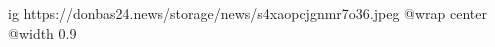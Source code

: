  
 
 
 
 

\ifcmt
  ig https://donbas24.news/storage/news/s4xaopcjgnmr7o36.jpeg
  @wrap center
  @width 0.9
\fi
